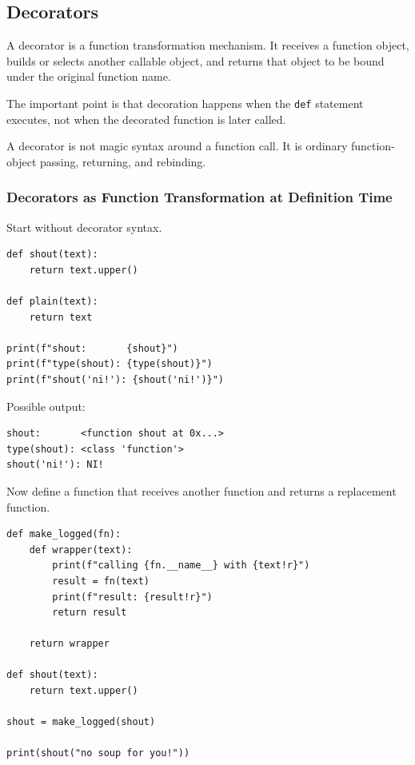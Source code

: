 \subsection{Decorators}

A decorator is a function transformation mechanism. It receives a function object, builds or selects another callable object, and returns that object to be bound under the original function name.

The important point is that decoration happens when the \texttt{def} statement executes, not when the decorated function is later called.

A decorator is not magic syntax around a function call. It is ordinary function-object passing, returning, and rebinding.

\subsubsection{Decorators as Function Transformation at Definition Time}

Start without decorator syntax.

\begin{verbatim}
def shout(text):
    return text.upper()

def plain(text):
    return text

print(f"shout:       {shout}")
print(f"type(shout): {type(shout)}")
print(f"shout('ni!'): {shout('ni!')}")
\end{verbatim}

Possible output:

\begin{verbatim}
shout:       <function shout at 0x...>
type(shout): <class 'function'>
shout('ni!'): NI!
\end{verbatim}

Now define a function that receives another function and returns a replacement function.

\begin{verbatim}
def make_logged(fn):
    def wrapper(text):
        print(f"calling {fn.__name__} with {text!r}")
        result = fn(text)
        print(f"result: {result!r}")
        return result

    return wrapper

def shout(text):
    return text.upper()

shout = make_logged(shout)

print(shout("no soup for you!"))
\end{verbatim}

